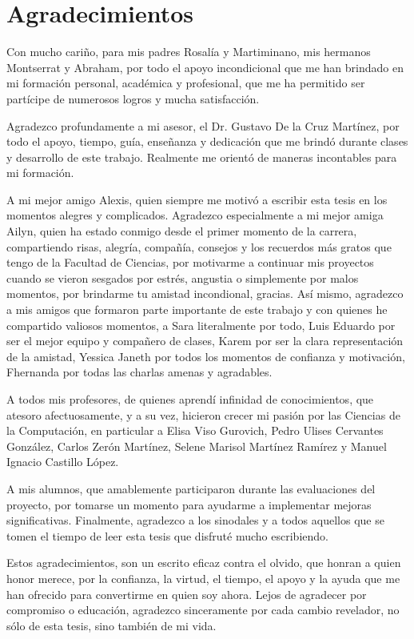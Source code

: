 \chapter*{Agradecimientos}

Con mucho cariño, para mis padres Rosalía y Martiminano, mis hermanos Montserrat y Abraham, por todo el apoyo incondicional que me han brindado en mi formación personal, académica y profesional, que me ha permitido ser partícipe de numerosos logros y mucha satisfacción.

Agradezco profundamente a mi asesor, el Dr. Gustavo De la Cruz Martínez, por todo el apoyo, tiempo, guía, enseñanza y dedicación que me brindó durante clases y desarrollo de este trabajo. Realmente me orientó de maneras incontables para mi formación.

A mi mejor amigo Alexis, quien siempre me motivó a escribir esta tesis en los momentos alegres y complicados. Agradezco especialmente a mi mejor amiga Ailyn, quien ha estado conmigo desde el primer momento de la carrera, compartiendo risas, alegría, compañía, consejos y los recuerdos más gratos que tengo de la Facultad de Ciencias, por motivarme a continuar mis proyectos cuando se vieron sesgados por estrés, angustia o simplemente por malos momentos, por brindarme tu amistad incondional, gracias. Así mismo, agradezco a mis amigos que formaron parte importante de este trabajo y con quienes he compartido valiosos momentos, a Sara literalmente por todo, Luis Eduardo por ser el mejor equipo y compañero de clases, Karem por ser la clara representación de la amistad, Yessica Janeth por todos los momentos de confianza y motivación, Fhernanda por todas las charlas amenas y agradables.

A todos mis profesores, de quienes aprendí infinidad de conocimientos, que atesoro afectuosamente, y a su vez, hicieron crecer mi pasión por las Ciencias de la Computación, en particular a Elisa Viso Gurovich, Pedro Ulises Cervantes González, Carlos Zerón Martínez, Selene Marisol Martínez Ramírez y Manuel Ignacio Castillo López.

A mis alumnos, que amablemente participaron durante las evaluaciones del proyecto, por tomarse un momento para ayudarme a implementar mejoras significativas. Finalmente, agradezco a los sinodales y a todos aquellos que se tomen el tiempo de leer esta tesis que disfruté mucho escribiendo.

Estos agradecimientos, son un escrito eficaz contra el olvido, que honran a quien honor merece, por la confianza, la virtud, el tiempo, el apoyo y la ayuda que me han ofrecido para convertirme en quien soy ahora. Lejos de agradecer por compromiso o educación, agradezco sinceramente por cada cambio revelador, no sólo de esta tesis, sino también de mi vida.
